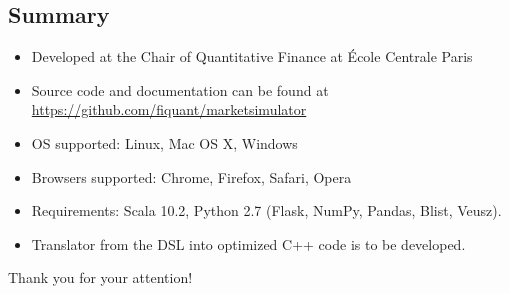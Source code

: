 \documentclass{beamer}
\begin{document}
\subsection{Summary}
\begin{frame}
\begin{itemize}
\item Developed at the Chair of Quantitative Finance at \'{E}cole Centrale Paris
\item Source code and documentation can be found at   \textcolor[rgb]{0.00,0.50,0.75}{\href{https://github.com/fiquant/marketsimulator}{https://github.com/fiquant/marketsimulator}}
\item OS supported: Linux, Mac OS X, Windows
\item Browsers supported: Chrome, Firefox, Safari, Opera
\item Requirements: Scala 10.2, Python 2.7 (Flask, NumPy, Pandas, Blist, Veusz).
\item Translator from the DSL into optimized C++ code is to be developed.
\end{itemize}

\end{frame}

\begin{frame}
\Huge{\centerline{Thank you for your attention!}}
\end{frame}

\end{document}
